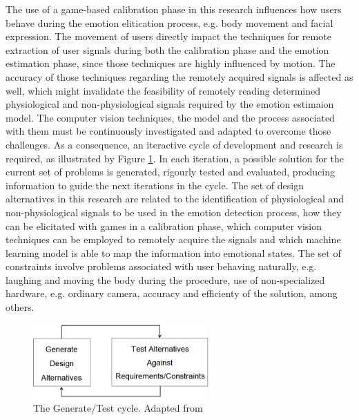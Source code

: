 The use of a game-based calibration phase in this research influences how users behave during the emotion elitication process, e.g. body movement and facial expression. The movement of users directly impact the techniques for remote extraction of user signals during both the calibration phase and the emotion estimation phase, since those techniques are highly influenced by motion. The accuracy of those techniques regarding the remotely acquired signals is affected as well, which might invalidate the feasibility of remotely reading determined physiological and non-physiological signals required by the emotion estimaion model. The computer vision techniques, the model and the process associated with them must be continuously investigated and adapted to overcome those challenges. As a consequence, an iteractive cycle of development and research is required, as illustrated by Figure \ref{fig:hevner-generate-test}. In each iteration, a possible solution for the current set of problems is generated, rigourly tested and evaluated, producing information to guide the next iterations in the cycle. The set of design alternatives in this research are related to the identification of physiological and non-physiological signals to be used in the emotion detection process, how they can be elicitated with games in a calibration phase, which computer vision techniques can be employed to remotely acquire the signals and which machine learning model is able to map the information into emotional states. The set of constraints involve problems associated with user behaving naturally, e.g. laughing and moving the body during the procedure, use of non-specialized hardware, e.g. ordinary camera, accuracy and efficienty of the solution, among others.

\begin{figure}[h]
    \centering
    \includegraphics[width=0.6\textwidth]{figures/hevner-generate-test.png}
    \caption{The Generate/Test cycle. Adapted from \textcite{hevner2004design}}
    \label{fig:hevner-generate-test}
\end{figure}

